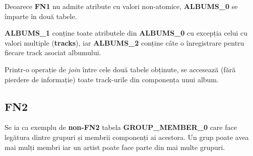 \documentclass[a4paper, oneside, 12pt]{article}
\newcommand{\rowstyle}[1]{\gdef\currentrowstyle{#1}%
  #1\ignorespaces
}
\begin{document}
Deoarece \textbf{FN1} nu admite atribute cu valori non-atomice,
\textbf{ALBUMS\_0} se împarte în două tabele.

\textbf{ALBUMS\_1} conține
toate atributele din \textbf{ALBUMS\_0} cu excepția celui cu valori multiple (\textbf{tracks}),
iar \textbf{ALBUMS\_2} conține câte o înregistrare pentru fiecare track asociat albumului.

Printr-o operație de \emph{join} între cele două tabele obținute, se accesează
(fără pierdere de informație) toate track-urile din componența unui album.



\begin{table}[h]
\centering
\caption*{Tabela \textbf{ALBUMS\_1}:}
\end{table}

\begin{table}[H]
\centering
\caption*{Tabela \textbf{ALBUMS\_2}:}
\end{table}

\subsection{FN2}

Se ia ca exemplu de \textbf{non-FN2} tabela \textbf{GROUP\_MEMBER\_0} care face
legătura dintre grupuri și membrii componenți ai acestora. Un grup poate avea
mai mulți membri iar un artist poate face parte din mai multe grupuri.
\end{document}
